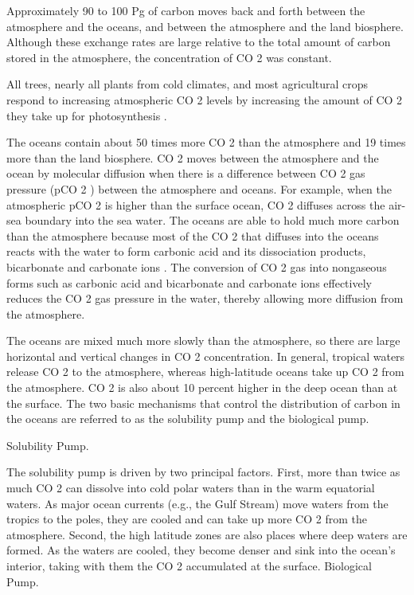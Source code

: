 \documentclass[
]{book}
\begin{document}
Approximately 90 to 100 Pg of carbon moves back and forth between the atmosphere and the oceans, and between the atmosphere and the land biosphere. Although these exchange rates are large relative to the total amount of carbon stored in the atmosphere, the concentration of CO 2 was constant.

All trees, nearly all plants from cold climates, and most agricultural crops respond to increasing atmospheric CO 2 levels by increasing the amount of CO 2 they take up for photosynthesis .

The oceans contain about 50 times more CO 2 than the atmosphere and 19 times more than the land biosphere. CO 2 moves between the atmosphere and the ocean by molecular diffusion when there is a difference between CO 2 gas pressure (pCO 2 ) between the atmosphere and oceans. For example, when the atmospheric pCO 2 is higher than the surface ocean, CO 2 diffuses across the air-sea boundary into the sea water.
The oceans are able to hold much more carbon than the atmosphere because most of the CO 2 that diffuses into the oceans reacts with the water to form carbonic acid and its dissociation products, bicarbonate and carbonate ions . The conversion of CO 2 gas into nongaseous forms such as carbonic acid and bicarbonate and carbonate ions effectively reduces the CO 2 gas pressure in the water, thereby allowing more diffusion from the atmosphere.

The oceans are mixed much more slowly than the atmosphere, so there are large horizontal and vertical changes in CO 2 concentration. In general, tropical waters release CO 2 to the atmosphere, whereas high-latitude oceans take up CO 2 from the atmosphere. CO 2 is also about 10 percent higher in the deep ocean than at the surface. The two basic mechanisms that control the distribution of carbon in the oceans are referred to as the solubility pump and the biological pump.

Solubility Pump.

The solubility pump is driven by two principal factors. First, more than twice as much CO 2 can dissolve into cold polar waters than in the warm equatorial waters. As major ocean currents (e.g., the Gulf Stream) move waters from the tropics to the poles, they are cooled and can take up more CO 2 from the atmosphere. Second, the high latitude zones are also places where deep waters are formed. As the waters are cooled, they become denser and sink into the ocean's interior, taking with them the CO 2 accumulated at the surface.
Biological Pump.
\end{document}
